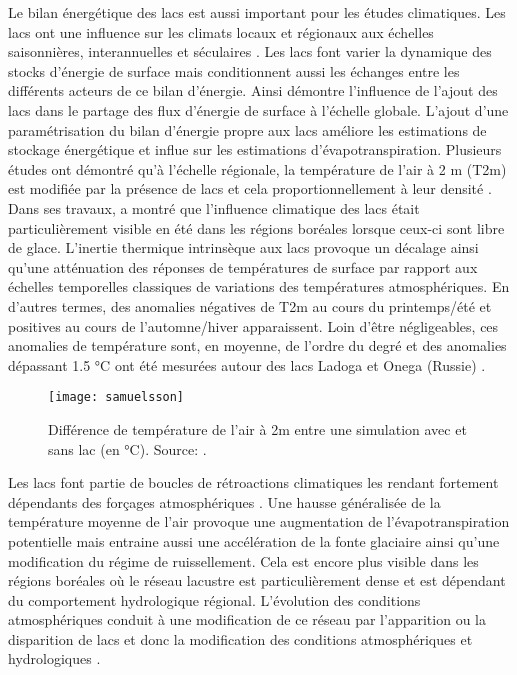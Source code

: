 Le bilan énergétique des lacs est aussi important pour les études climatiques. Les lacs ont une influence sur les climats locaux et régionaux aux échelles saisonnières, interannuelles et séculaires \citep{bonan1995,samuelsson2010, bowling2010, martynov2012,lemoigne2016}. Les lacs font varier la dynamique des stocks d'énergie de surface mais conditionnent aussi les échanges entre les différents acteurs de ce bilan d'énergie. Ainsi \citet{dutra2010} démontre l'influence de l'ajout des lacs dans le partage des flux d'énergie de surface à l'échelle globale. L'ajout d'une paramétrisation du bilan d'énergie propre aux lacs améliore les estimations de stockage énergétique et influe sur les estimations d'évapotranspiration. Plusieurs études ont démontré qu'à l'échelle régionale, la température de l'air à 2 m (T2m) est modifiée par la présence de lacs et cela proportionnellement à leur densité \citep{samuelsson2010,lemoigne2016}. Dans ses travaux, \citet{krinner2003} a montré que l'influence climatique des lacs était particulièrement visible en été dans les régions boréales lorsque ceux-ci sont libre de glace. L'inertie thermique intrinsèque aux lacs provoque un décalage ainsi qu'une atténuation des réponses de températures de surface par rapport aux échelles temporelles classiques de variations des températures atmosphériques. En d'autres termes, des anomalies négatives de T2m au cours du  printemps/été et positives au cours de l'automne/hiver apparaissent. Loin d'être négligeables, ces anomalies de température sont, en moyenne, de l'ordre du degré et des anomalies dépassant 1.5 °C ont été mesurées autour des lacs Ladoga et Onega (Russie) \citep[Figure \ref{samuelsson},][]{samuelsson2010}. \\
\clearpage
\begin{figure}[h!]
 \centerline{\texttt{[image: samuelsson]}}
 \caption{Différence de température de l'air à 2m entre une simulation avec et sans lac (en °C). Source: \citet{samuelsson2010}.}
 \label{samuelsson}
\end{figure}

Les lacs font partie de boucles de rétroactions climatiques les rendant fortement dépendants des forçages atmosphériques \citep{de2006,lei2014,mao2018}. Une hausse généralisée de la température moyenne de l’air provoque une augmentation de l’évapotranspiration potentielle mais entraine aussi une accélération de la fonte glaciaire ainsi qu'une modification du régime de ruissellement. Cela est encore plus visible dans les régions boréales où le réseau lacustre est particulièrement dense et est dépendant du comportement hydrologique régional. L’évolution des conditions atmosphériques conduit à une modification de ce réseau par l’apparition ou la disparition de lacs et donc la modification des conditions atmosphériques et hydrologiques \citep{chen2013}. \\

